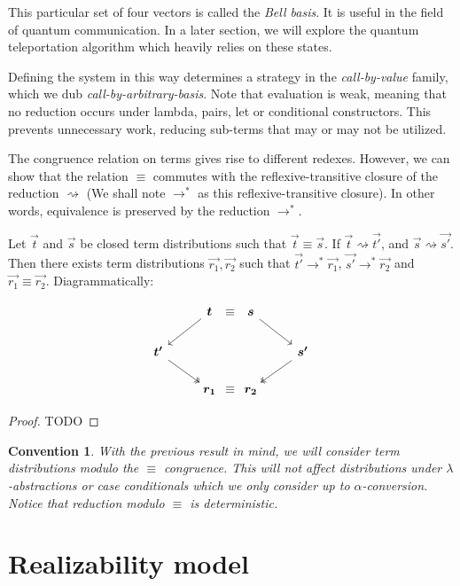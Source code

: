 \documentclass[runningheads,orivec,envcountsame,envcountsect]{llncs}
\newtheorem{convention}{Convention}
\newcommand\lra{\longrightarrow}
\def\lraneq{\rightsquigarrow}
\def\eval{\lra^*}
\begin{document}
This particular set of four vectors is called the \textit{Bell basis}. It is useful in the field of quantum communication. In a later section, we will explore the quantum teleportation algorithm which heavily relies on these states. 

Defining the system in this way determines a strategy in the \textit{call-by-value} family, which we dub \textit{call-by-arbitrary-basis}. Note that evaluation is weak, meaning that no reduction occurs under lambda, pairs, let or conditional constructors. This prevents unnecessary work, reducing sub-terms that may or may not be utilized.

The congruence relation on terms gives rise to different redexes. However, we can show that the relation $\equiv$ commutes with the reflexive-transitive closure of the reduction $\lraneq$ (We shall note $\eval$ as this reflexive-transitive closure). In other words, equivalence is preserved by the reduction $\eval$.

\begin{theorem}
  Let $\vec{t}$ and $\vec{s}$ be closed term distributions such that $\vec{t}\equiv\vec{s}$. If $\vec{t}\lraneq\vec{t'}$, and $\vec{s}\lraneq\vec{s'}$. Then there exists term distributions $\vec{r_1},\vec{r_2}$ such that $\vec{t'}\eval\vec{r_1}$, $\vec{s'}\eval\vec{r_2}$ and $\vec{r_1}\equiv\vec{r_2}$. Diagrammatically:

\[
  \begin{tikzcd}
   & \vec{t} \arrow[ld]&[-2.5em] \equiv &[-2.5em] \vec{s}\arrow[rd] &\\
   \vec{t'}\arrow[dr, twoheadrightarrow] & & & & \vec{s'}\arrow[ld, twoheadrightarrow] \\
   & \vec{r_1} & \equiv & \vec{r_2} &
  \end{tikzcd}
\]
\end{theorem}

\begin{proof}
  {\color{red}TODO}
\end{proof}

\begin{convention}
  With the previous result in mind, we will consider term distributions modulo the $\equiv$ congruence. This will not affect distributions under $\lambda$-abstractions or case conditionals which we only consider up to $\alpha$-conversion. Notice that reduction modulo $\equiv$ is deterministic.
\end{convention}


\section{Realizability model}\label{sec:model}
\end{document}
